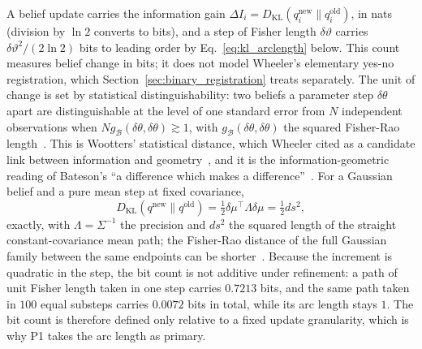 A belief update carries the information gain $\Delta I_i = D_{\mathrm{KL}}(q_i^{\text{new}} \| q_i^{\text{old}})$, in nats (division by $\ln 2$ converts to bits), and a step of Fisher length $\delta\vartheta$ carries $\delta\vartheta^2/(2\ln 2)$ bits to leading order by Eq.~\eqref{eq:kl_arclength} below. This count measures belief change in bits; it does not model Wheeler's elementary yes-no registration, which Section~\ref{sec:binary_registration} treats separately. The unit of change is set by statistical distinguishability: two beliefs a parameter step $\delta\theta$ apart are distinguishable at the level of one standard error from $N$ independent observations when $N g_{\mathcal{B}}(\delta\theta, \delta\theta) \gtrsim 1$, with $g_{\mathcal{B}}(\delta\theta,\delta\theta)$ the squared Fisher-Rao length~\cite{Wootters1981, BraunsteinCaves1994, AmariNagaoka2000}. This is Wootters' statistical distance, which Wheeler cited as a candidate link between information and geometry~\cite{Wheeler1990}, and it is the information-geometric reading of Bateson's ``a difference which makes a difference''~\cite{Bateson1972}. For a Gaussian belief and a pure mean step at fixed covariance,
\begin{equation}
D_{\mathrm{KL}}(q^{\text{new}} \| q^{\text{old}}) = \tfrac{1}{2}\delta\mu^\top \Lambda \delta\mu = \tfrac{1}{2}ds^2,
\label{eq:kl_arclength}
\end{equation}
exactly, with $\Lambda = \Sigma^{-1}$ the precision and $ds^2$ the squared length of the straight constant-covariance mean path; the Fisher-Rao distance of the full Gaussian family between the same endpoints can be shorter~\cite[Ch.~7]{DennisGaugeVFE2026}. Because the increment is quadratic in the step, the bit count is not additive under refinement: a path of unit Fisher length taken in one step carries $0.7213$ bits, and the same path taken in $100$ equal substeps carries $0.0072$ bits in total, while its arc length stays $1$. The bit count is therefore defined only relative to a fixed update granularity, which is why P1 takes the arc length as primary.

